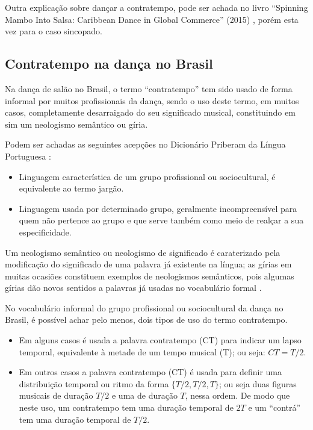Outra explicação sobre dançar a contratempo, pode ser achada
no livro ``Spinning Mambo Into Salsa: Caribbean Dance in Global Commerce'' (2015) \cite[pp. 68]{mcmains2015spinning},
porém esta vez para o caso sincopado. 


\subsection{Contratempo na dança no Brasil}
\label{subsec:contratempobrasil}
Na dança de salão no Brasil, 
o termo ``contratempo'' tem sido usado de forma informal por muitos profissionais da dança,
sendo o uso deste termo, em muitos casos, completamente desarraigado do seu significado musical,
constituindo em sim um neologismo semântico ou gíria.

\begin{definition}[Gíria] 
\label{def:Giria}
Podem ser achadas as seguintes acepções no Dicionário Priberam da Língua Portuguesa \cite{priberamgiria}:
\begin{itemize}
\item Linguagem característica de um grupo profissional ou sociocultural, é equivalente ao termo jargão.
\item Linguagem usada por determinado grupo, 
geralmente incompreensível para quem não pertence ao grupo e que serve também como meio de realçar a sua especificidade.
\end{itemize}
\end{definition}

\begin{definition} 
\label{def:NeologismoSemantico}
Um neologismo semântico ou neologismo de significado é caraterizado pela modificação 
do significado de uma palavra já existente na língua;
as gírias em muitas ocasiões constituem exemplos de neologismos semânticos, 
pois algumas gírias dão novos sentidos a palavras já usadas no vocabulário formal \cite[pp. 82-83]{correalingua}.
\end{definition}

No vocabulário informal do grupo profissional ou sociocultural da dança no Brasil,
é possível achar pelo menos, dois tipos de uso do termo contratempo.
\begin{itemize}
\item Em alguns casos é usada a palavra contratempo (CT) para indicar um lapso temporal, 
equivalente à metade de um tempo musical (T); ou seja: $CT=T/2$.
\item Em outros casos a palavra contratempo (CT) é usada para definir uma distribuição temporal 
ou ritmo da forma $\{T/2, T/2, T\}$; ou seja duas figuras musicais de duração $T/2$ e uma de duração $T$,
nessa ordem. De modo que neste uso, um contratempo tem uma duração temporal de $2T$
e um ``contrá'' tem uma duração temporal de $T/2$. 
\end{itemize}

